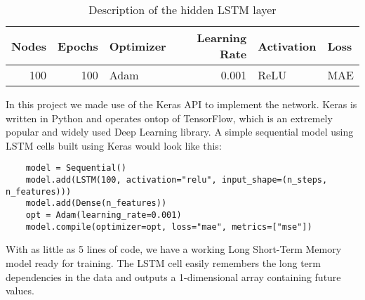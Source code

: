 \begin{table}[h]
    \centering
    \begin{tabular}{|r|r|l|r|l|l|}
        \hline
        \textbf{Nodes} & \textbf{Epochs} & \textbf{Optimizer} & \textbf{Learning Rate} & \textbf{Activation} & \textbf{Loss} \\ \hline
        100            & 100             & Adam               & 0.001                  & ReLU                & MAE           \\ \hline
        \end{tabular}
    \caption{Description of the hidden LSTM layer}
    \label{tab:lstm_layer}
\end{table}

In this project we made use of the Keras API to implement the network. Keras is written in Python and operates ontop of TensorFlow, which is an extremely popular and widely used Deep Learning library. A simple sequential model using LSTM cells built using Keras would look like this:

\begin{verbatim}
    model = Sequential()
    model.add(LSTM(100, activation="relu", input_shape=(n_steps, n_features)))
    model.add(Dense(n_features))
    opt = Adam(learning_rate=0.001)
    model.compile(optimizer=opt, loss="mae", metrics=["mse"])
\end{verbatim}

With as little as 5 lines of code, we have a working Long Short-Term Memory model ready for training. The LSTM cell easily remembers the long term dependencies in the data and outputs a 1-dimensional array containing future values.


